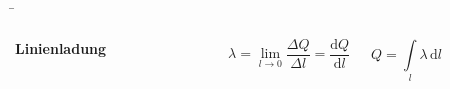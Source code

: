 \begin{frame}
{	
	}

	\b{
	\begin{columns}
		
				\textbf{Linienladung}
				\vspace{20pt}
				\begin{figure}[h!]
					\centering
				
				{}
					
				\end{figure}	
			
			\vspace{10pt}
				 
				\begin{equation*}
				\lambda = \lim \limits_{l \to 0} \frac{\Delta Q}{\Delta l} = \frac{\mathrm{d}Q}{\mathrm{d}l}
			\end{equation*}
			
			\begin{equation*}
				Q = \int\limits_l \lambda \, \mathrm{d}l
			\end{equation*}
			

			\rule{.1mm}{0.7\textheight}


		\vspace{2pt}
	
				
		\rule{.1mm}{0.7\textheight}


\end{columns}}
\end{frame}
